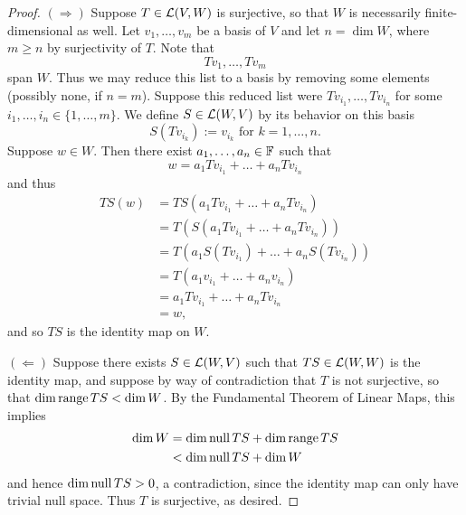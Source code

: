 \begin{proof}
	$(\Rightarrow)$  Suppose $T\in\mathcal{L}(V,W)$ is surjective, so that $W$ is necessarily finite-dimensional as well.  Let $v_1,\dots, v_m$ be a basis of $V$ and let $n=\dim W$, where $m\geq n $ by surjectivity of $T$.  Note that
	\begin{equation*}
		Tv_1,\dots, Tv_m
	\end{equation*}
	span $W$.  Thus we may reduce this list to a basis by removing some elements (possibly none, if $n = m$).  Suppose this reduced list were $Tv_{i_1},\dots, Tv_{i_n}$ for some $i_1,\dots, i_n\in\{1,\dots, m\}$.  We define $S\in\mathcal{L}(W,V)$ by its behavior on this basis
	\begin{equation*}
		S(Tv_{i_k}) := v_{i_k} \text{ for }k = 1,\dots, n.
	\end{equation*}
	Suppose $w \in W$.  Then there exist $a_1,\dots, a_n\in\mathbb{F}$ such that
	\begin{equation*}
		w = a_1 Tv_{i_1} + \dots + a_nTv_{i_n}
	\end{equation*}
	and thus
	\begin{align*}
		TS(w) & = TS\left(a_1 Tv_{i_1} + \dots + a_nTv_{i_n}\right)               \\
		      & = T\left(S\left( a_1 Tv_{i_1} + \dots + a_nTv_{i_n}\right)\right) \\
		      & = T\left( a_1 S(Tv_{i_1}) + \dots + a_nS(Tv_{i_n})\right)         \\
		      & = T(a_1 v_{i_1} + \dots + a_nv_{i_n})                             \\
		      & = a_1 Tv_{i_1} + \dots + a_nTv_{i_n}                              \\
		      & = w,
	\end{align*}
	and so $TS$ is the identity map on $W$.
	\par $(\Leftarrow)$ Suppose there exists $S\in\mathcal{L}(W,V)$ such that $TS\in\mathcal{L}(W,W)$ is the identity map, and suppose by way of contradiction that $T$ is not surjective, so that $\dim \operatorname{range} TS < \dim W$.  By the Fundamental Theorem of Linear Maps, this implies
	\begin{align*}
		\dim W & = \dim\operatorname{null} TS + \dim \operatorname{range} TS \\
		       & < \dim\operatorname{null} TS + \dim W
	\end{align*}
	and hence $\dim\operatorname{null} TS > 0$, a contradiction, since the identity map can only have trivial null space.  Thus $T$ is surjective, as desired.
\end{proof}
